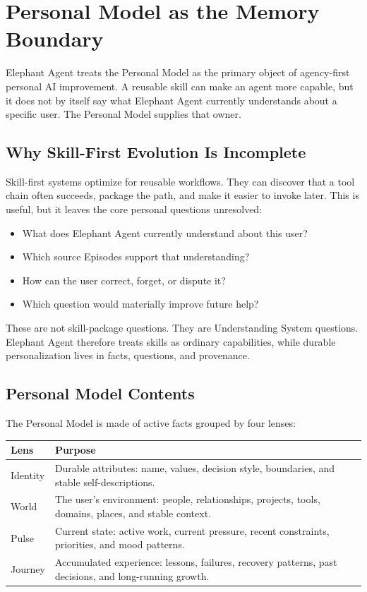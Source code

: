 \section{Personal Model as the Memory Boundary}
\label{sec:abstraction}

Elephant Agent treats the Personal Model as the primary object of agency-first
personal AI improvement. A reusable skill can make an agent more capable, but
it does not by itself say what Elephant Agent currently understands about a
specific user. The Personal Model supplies that owner.

\subsection{Why Skill-First Evolution Is Incomplete}

Skill-first systems optimize for reusable workflows. They can discover that a
tool chain often succeeds, package the path, and make it easier to invoke
later. This is useful, but it leaves the core personal questions unresolved:

\begin{itemize}[leftmargin=*]
  \item What does Elephant Agent currently understand about this user?
  \item Which source Episodes support that understanding?
  \item How can the user correct, forget, or dispute it?
  \item Which question would materially improve future help?
\end{itemize}

These are not skill-package questions. They are Understanding System questions.
Elephant Agent therefore treats skills as ordinary capabilities, while durable
personalization lives in facts, questions, and provenance.

\subsection{Personal Model Contents}

The Personal Model is made of active facts grouped by four lenses:

\begin{center}
\begin{tabularx}{0.98\linewidth}{@{}lX@{}}
\toprule
\textbf{Lens} & \textbf{Purpose} \\
\midrule
Identity & Durable attributes: name, values, decision style, boundaries, and stable self-descriptions. \\
World & The user's environment: people, relationships, projects, tools, domains, places, and stable context. \\
Pulse & Current state: active work, current pressure, recent constraints, priorities, and mood patterns. \\
Journey & Accumulated experience: lessons, failures, recovery patterns, past decisions, and long-running growth. \\
\bottomrule
\end{tabularx}
\end{center}

